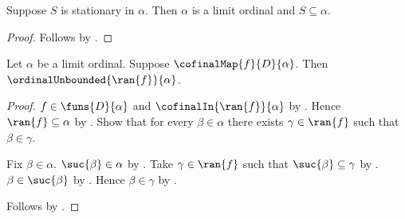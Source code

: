 \begin{proposition}\label{stationary_in_elim}
    Suppose $S$ is stationary in $\alpha$.
    Then $\alpha$ is a limit ordinal and $S\subseteq\alpha$.
\end{proposition}
\begin{proof}
    Follows by .
\end{proof}

\begin{proposition}\label{cofinal_map_into_limit_has_unbounded_range}
    Let $\alpha$ be a limit ordinal.
    Suppose $\cofinalMap{f}{D}{\alpha}$.
    Then $\ordinalUnbounded{\ran{f}}{\alpha}$.
\end{proposition}
\begin{proof}
    $f\in\funs{D}{\alpha}$ and $\cofinalIn{\ran{f}}{\alpha}$
        by .
    Hence $\ran{f}\subseteq\alpha$ by .
    Show that for every $\beta\in\alpha$ there exists
        $\gamma\in\ran{f}$ such that $\beta\in\gamma$.
    \begin{subproof}
        Fix $\beta\in\alpha$.
        $\suc{\beta}\in\alpha$ by .
        Take $\gamma\in\ran{f}$ such that $\suc{\beta}\subseteq\gamma$
            by .
        $\beta\in\suc{\beta}$ by .
        Hence $\beta\in\gamma$ by .
    \end{subproof}
    Follows by .
\end{proof}


